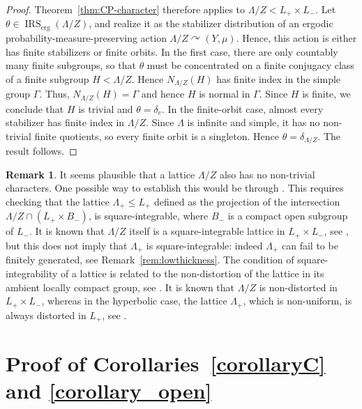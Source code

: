 \documentclass[12pt,a4paper]{amsproc}
\theoremstyle{definition}
\newtheorem{remark}[theorem]{Remark}
\DeclareMathOperator{\IRS}{IRS}
\newcommand{\IRSerg}{\IRS_{\mathrm{erg}}}
\begin{document}
\begin{proof}
Theorem~\ref{thm:CP-character} therefore applies to
\(\Lambda/Z<L_+\times L_-\). 
Let \(\theta\in\IRSerg(\Lambda/Z)\), and realize it as the stabilizer
distribution of an ergodic probability-measure-preserving action
\(\Lambda/Z \curvearrowright (Y,\mu)\). 
Hence,  this action is either has finite stabilizers or finite
orbits. 
In the first case, there are only countably many finite subgroups, so that $\theta$ must be concentrated on a finite conjugacy class of a finite subgroup $H < \Lambda/Z$. Hence $N_{\Lambda/Z}(H)$ has finite index in the simple group $\Gamma$. Thus, $N_{\Lambda/Z}(H) = \Gamma$ and hence $H$ is normal in $\Gamma.$ Since $H$ is finite, we conclude that $H$ is trivial and $\theta = \delta_{e}$.
In the finite-orbit case, almost every stabilizer has finite index in
\(\Lambda/Z\). Since \(\Lambda\) is infinite and simple, it has no non-trivial
finite quotients, so every finite orbit is a singleton. Hence
\(\theta=\delta_{\Lambda/Z}\). The result follows. 
\end{proof}

\begin{remark}
  It seems plausible that a lattice $\Lambda/Z$ also has no non-trivial characters. One possible way to establish this would be through  \cite[Corollary~6.6]{CrePet2}. This requires checking that the lattice $\Lambda_+ \leq  L_+$ defined as the projection of the intersection $\Lambda/Z \cap (L_+ \times B_-)$, is square-integrable, where $B_-$ is a compact open subgroup of $L_-$.  It is known that $\Lambda/Z$ itself is a square-integrable lattice in $L_+\times L_-$, see \cite{RemyIntegrability}, but this does not imply that $\Lambda_+$ is square-integrable: indeed $\Lambda_+$ can fail to be finitely generated, see Remark~\ref{rem:lowthickness}.  The condition of square-integrability of a lattice is related to the non-distortion of the lattice in its ambient locally compact group, see \cite[Theorem~1.3]{CapRem_nondist}. It is known that $\Lambda/Z$ is non-distorted in $L_+ \times L_-$, whereas in the hyperbolic case, the lattice $\Lambda_+$, which is non-uniform, is always distorted in $L_+$, see \cite[Theorem~1.1 and Section~3.3]{CapRem_nondist}. 
\end{remark}

    
\section{Proof of Corollaries~\ref{corollaryC} and \ref{corollary_open}}
\label{sec:regular}
\end{document}
